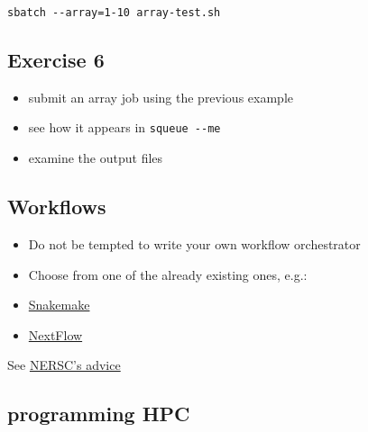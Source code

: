 \documentclass[
  letterpaper,
  DIV=11,
  numbers=noendperiod]{scrartcl}
\newenvironment{Shaded}{\begin{snugshade}}{\end{snugshade}}
\newcommand{\BuiltInTok}[1]{\textcolor[rgb]{0.00,0.23,0.31}{#1}}
\newcommand{\CommentTok}[1]{\textcolor[rgb]{0.37,0.37,0.37}{#1}}
\newcommand{\StringTok}[1]{\textcolor[rgb]{0.13,0.47,0.30}{#1}}
\newcommand{\VariableTok}[1]{\textcolor[rgb]{0.07,0.07,0.07}{#1}}
\providecommand{\tightlist}{%
  \setlength{\itemsep}{0pt}\setlength{\parskip}{0pt}}
\begin{document}
\begin{Shaded}
\end{Shaded}

\texttt{sbatch\ -\/-array=1-10\ array-test.sh}

\subsection{Exercise 6}\label{exercise-6}

\begin{itemize}
\tightlist
\item
  submit an array job using the previous example
\item
  see how it appears in \texttt{squeue\ -\/-me}
\item
  examine the output files
\end{itemize}

\subsection{Workflows}\label{workflows}

\begin{itemize}
\item
  Do not be tempted to write your own workflow orchestrator
\item
  Choose from one of the already existing ones, e.g.:
\item
  \href{https://snakemake.readthedocs.io/en/stable/}{Snakemake}
\item
  \href{https://www.nextflow.io/docs/latest/}{NextFlow}
\end{itemize}

See \href{https://docs.nersc.gov/jobs/workflow/}{NERSC's advice}

\subsection{programming HPC}\label{programming-hpc}
\end{document}
